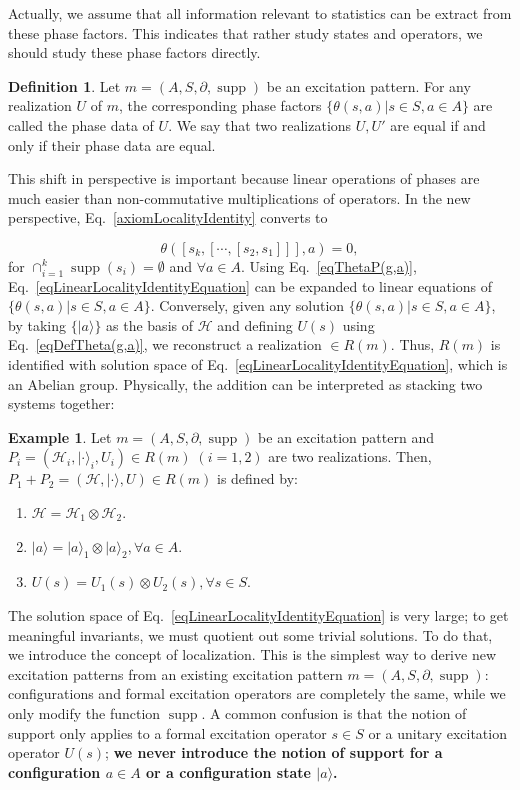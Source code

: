 \documentclass[reprint, amsmath, amssymb, showpacs, floatfix, longbibliography, aps, twocolumn, superscriptaddress, nofootinbib]{revtex4-2}
\newcommand{\supp}{\operatorname{supp}}
\theoremstyle{definition}
\newtheorem{definition}{Definition}[section]
\newtheorem{example}{Example}[section]
\begin{document}
Actually, we assume that all information relevant to statistics can be extract from these phase factors. This indicates that rather study states and operators, we should study these phase factors directly. 
\begin{definition}\label{defEqualRealization}
Let $m=(A,S,\partial,\supp)$ be an excitation pattern. For any realization $U$ of $m$, the corresponding phase factors $\{\theta(s,a)|s\in S,a\in A\}$ are called the phase data of $U$. We say that two realizations $U,U'$ are equal if and only if their phase data are equal.
\end{definition}

This shift in perspective is important because linear operations of phases are much easier than non-commutative multiplications of operators. In the new perspective, Eq.~\eqref{axiomLocalityIdentity} converts to

\begin{equation}\label{eqLinearLocalityIdentityEquation}
	\theta([s_k, [\cdots, [s_2, s_1]]],a)=0,
\end{equation}
for $\cap_{i=1}^k\supp(s_i)=\emptyset$ and $\forall a\in A$. Using Eq.~\eqref{eqThetaP(g,a)}, Eq.~\eqref{eqLinearLocalityIdentityEquation} can be expanded to linear equations of $\{\theta(s,a)|s\in S,a\in A\}$. Conversely, given any solution $\{\theta(s,a)|s\in S,a\in A\}$, by taking $\{|a\rangle\}$ as the basis of $\mathcal{H}$ and defining $U(s)$ using Eq.~\eqref{eqDefTheta(g,a)}, we reconstruct a realization $\in R(m)$. Thus, $R(m)$ is identified with solution space of Eq.~\eqref{eqLinearLocalityIdentityEquation}, which is an Abelian group. Physically, the addition can be interpreted as stacking two systems together:

\begin{example}
	Let $m=(A,S,\partial,\supp)$ be an excitation pattern and $P_i=(\mathcal{H}_i,|\cdot\rangle_i, U_i)\in R(m)\; (i=1,2)$ are two realizations. Then,  $P_1+ P_2=(\mathcal{H},|\cdot\rangle, U)\in R(m)$ is defined by:
	\begin{enumerate}
		\item $\mathcal{H}=\mathcal{H}_1\otimes \mathcal{H}_2$.
		\item $|a\rangle=|a\rangle_1\otimes|a\rangle_2,\forall a\in A$.
		\item $ U(s)= U_1(s)\otimes  U_2(s),\forall s\in S$.
	\end{enumerate}
\end{example}

The solution space of Eq.~\eqref{eqLinearLocalityIdentityEquation} is very large; to get meaningful invariants, we must quotient out some trivial solutions. To do that, we introduce the concept of localization. This is the simplest way to derive new excitation patterns from an existing excitation pattern $m=(A,S,\partial,\supp)$: configurations and formal excitation operators are completely the same, while we only modify the function $\supp$. A common confusion is that the notion of support only applies to a formal excitation operator $s\in S$ or a unitary excitation operator $U(s)$; \textbf{we never introduce the notion of support for a configuration $a\in A$ or a configuration state $|a\rangle$.}
\end{document}
